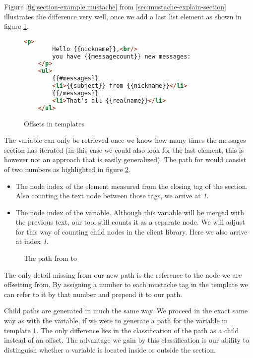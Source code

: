 \documentclass[thesis.tex]{subfiles}
\begin{document}
Figure \ref{fig:section-example.mustache} from \ref{sec:mustache-explain-section}
illustrates the difference very well, once we add a last list element as
shown in figure \ref{fig:offsets.mustache}.
\begin{figure}
	\centering
	\begin{lstlisting}[language=HTML]
	<p>
		Hello {{nickname}},<br/>
		you have {{messagecount}} new messages:
	</p>
	<ul>
		{{#messages}}
		<li>{{subject}} from {{nickname}}</li>
		{{/messages}}
		<li>That's all {{realname}}</li>
	</ul>
	\end{lstlisting}
	\caption{Offsets in templates}
	\label{fig:offsets.mustache}
\end{figure}
The  variable can only be retrieved once we know how
many times the messages section has iterated (in this case we could also look
for the last  element, this is however not an approach that is
easily generalized). The path for  would consist of
two numbers as highlighted in figure \ref{fig:messages.ast}.
\begin{itemize}
\item The node index of the  element measured from
      the closing tag of the  section.
      Also counting the text node between those tags, we arrive at \emph{1}.
\item The node index of the  variable. Although this
      variable will be merged with the previous text, our tool still counts it
      as a separate node. We will adjust for this way of counting child nodes in
      the client library. Here we also arrive at index \emph{1}.
\end{itemize}

\begin{figure}
	\centering
	\resizebox{\linewidth}{!}{}
	\caption{The path from  to }
	\label{fig:messages.ast}
\end{figure}

The only detail missing from our new path is the reference to the node we are
offsetting from. By assigning a number to each mustache tag in the template we
can refer to it by that number and prepend it to our path.

Child paths are generated in much the same way. We proceed in the exact same way
as with the  variable, if we were to generate a path
for the  variable in template \ref{fig:offsets.mustache}.
The only difference lies in the classification of the path as a child instead of
an offset.
The advantage we gain by this classification is our ability to distinguish
whether a variable is located inside or outside the section.
\end{document}
